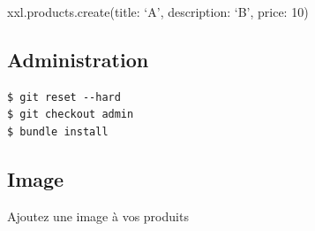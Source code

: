 xxl.products.create(title: `A', description: `B', price: 10)

\hypertarget{administration}{%
\subsection{Administration}\label{administration}}

\begin{english}

\begin{Shaded}
\begin{Highlighting}[]
\NormalTok{$ }

 \NormalTok{, }\StringTok{\textquotesingle{}\textasciitilde{}\textgreater{} 1.1\textquotesingle{}}

\NormalTok{$ }
\NormalTok{$ }
\NormalTok{$ }
\end{Highlighting}
\end{Shaded}

\end{english}

\begin{english}

\begin{verbatim}
$ git reset --hard
$ git checkout admin
$ bundle install
\end{verbatim}

\end{english}

\hypertarget{image}{%
\subsection{Image}\label{image}}

Ajoutez une image à vos produits

\begin{english}

\begin{Shaded}
\begin{Highlighting}[]
\NormalTok{$ }

 \NormalTok{, }\StringTok{\textquotesingle{}\textasciitilde{}\textgreater{} 5.1\textquotesingle{}}

\NormalTok{$ }
\end{Highlighting}
\end{Shaded}

\end{english}


